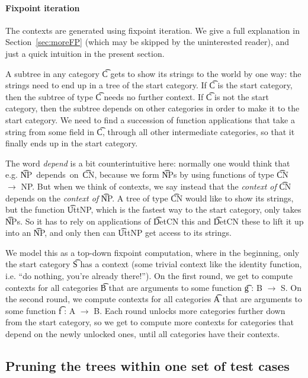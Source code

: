 \paragraph{Fixpoint iteration} 
The contexts are generated using fixpoint iteration. We give a full
explanation in Section~\ref{sec:moreFP} (which may be skipped by the
uninterested reader), and just a quick intuition in the
present section.

A subtree in any category \t{C} gets to show its strings to the world
by one way: the strings need to end up in a tree of the start
category.  If \t{C} is the start category, then the subtree of type
\t{C} needs no further context. If \t{C} is not the start category,
then the subtree depends on other categories in order to make it to
the start category. We need to find a succession of function
applications that take a string from some field in \t{C}, through all
other intermediate categories, so that it finally ends up in the start
category.

The word \emph{depend} is a bit counterintuitive here: normally one
would think that e.g. \t{NP}~depends~on~\t{CN}, because we form
\t{NP}s by using functions of type \t{CN $\rightarrow$ NP}. But when
we think of contexts, we say instead that the \emph{context of} \t{CN}
depends on the \emph{context of} \t{NP}. A tree of type \t{CN} would
like to show its strings, but the function \t{UttNP}, which is the
fastest way to the start category, only takes \t{NP}s. So it has to
rely on applications of \t{DetCN this} and \t{DetCN these} to lift it
up into an \t{NP}, and only then can \t{UttNP} get access to its
strings.

We model this as a top-down fixpoint computation, where in the beginning, only
the start category \t{S} has a context (some trivial context like the
identity function, i.e. ``do nothing, you're already there!''). On the
first round, we get to compute contexts for all categories \t{B} that
are arguments to some function \t{g : B $\rightarrow$ S}. On the
second round, we compute contexts for all categories \t{A} that are
arguments to some function \t{f : A $\rightarrow$ B}. Each round
unlocks more categories further down from the start category, so we
get to compute more contexts for categories that depend on the newly
unlocked ones, until all categories have their contexts.

\subsection{Pruning the trees within one set of test cases} 

